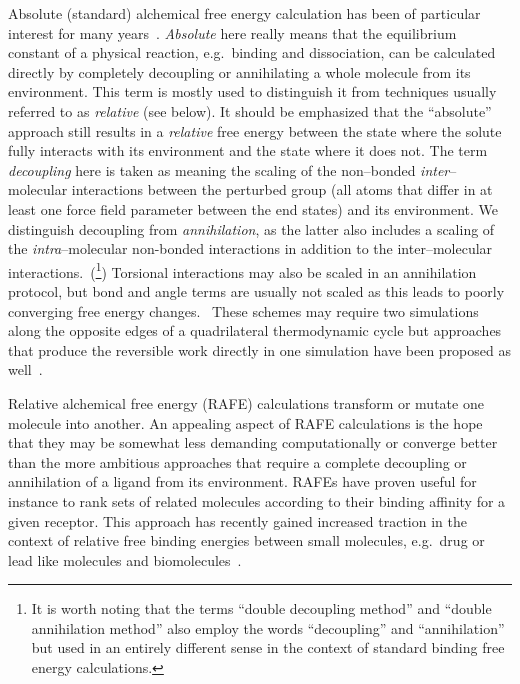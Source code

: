 \documentclass[journal=jctcce,manuscript=article]{achemso}
\begin{document}
Absolute (standard) alchemical free energy calculation has been of
particular interest for many years~\cite{GILSON19971047,
  doi:10.1021/jp0217839, deng_computations_2009, ytreberg_comparison_2006, doi:10.1021/ct500964e, jorgensen1988efficient}.  \emph{Absolute}
here really means that the equilibrium constant of a physical
reaction, e.g.\ binding and dissociation, can be calculated directly
by completely decoupling or annihilating a whole molecule from its environment.
This term is mostly used to distinguish it from techniques usually
referred to as \emph{relative} (see below).  It should be emphasized that the
``absolute'' approach still results in a \emph{relative} free energy
between the state where the solute fully interacts with its environment and the state where it does
not.
The term \emph{decoupling} here is taken as meaning the scaling of the non--bonded \emph{inter}--molecular interactions between the perturbed group (all atoms
that differ in at least one force field parameter between the end states) and
its environment.  We distinguish decoupling from \emph{annihilation},
as the latter also includes a scaling of
the \emph{intra}--molecular non-bonded interactions in addition to the
inter--molecular interactions.~\cite{shirtsmobleyreview_2013}(\footnote{It is worth noting that the terms ``double decoupling method'' and ``double annihilation method'' also employ the words ``decoupling'' and ``annihilation'' but used in an entirely different sense in the context of standard binding free energy calculations.})
Torsional interactions may also be scaled in an annihilation protocol, but bond and angle terms are usually not scaled as this leads to poorly converging free energy changes.~\cite{doi:10.1021/jp981628n}
These schemes may require two
simulations along the opposite edges of a quadrilateral thermodynamic cycle
but approaches that produce the reversible work directly in one simulation
have been proposed as well~\cite{doi:10.1063/1.3519057, C3FD00125C}.

Relative alchemical free energy (RAFE) calculations transform or
mutate one molecule into another.
An appealing aspect of RAFE calculations is the hope that they may be somewhat less demanding computationally
or converge better than the more ambitious approaches that require a complete decoupling or annihilation of a ligand from its environment.
RAFEs have proven useful for
instance to rank sets of related molecules according to their binding
affinity for a given receptor. This approach has
recently gained increased traction in the context of relative free
binding energies between small molecules, e.g.\ drug or lead like
molecules and biomolecules~\cite{doi:10.1021/ja512751q,
  doi:10.1021/acs.jctc.6b00991}.
\end{document}
